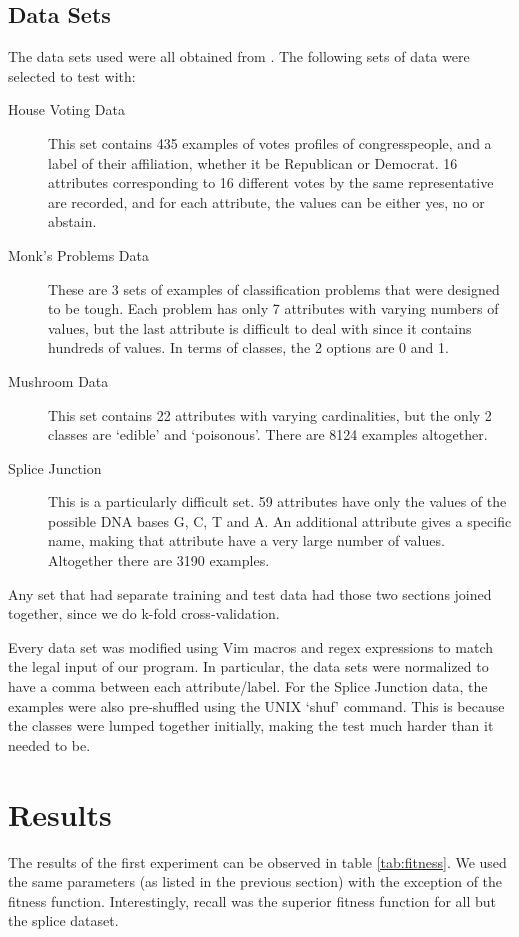 \documentclass[12pt, letterpaper]{article}
\begin{document}
\subsection*{Data Sets}
The data sets used were all obtained from \cite{ucimll}. The following sets of data were selected to test with:
\begin{description}
    \item[House Voting Data] This set contains 435 examples of votes profiles of congresspeople, and a label of their affiliation, whether it be Republican or Democrat. 16 attributes corresponding to 16 different votes by the same representative are recorded, and for each attribute, the values can be either yes, no or abstain.
    \item[Monk's Problems Data] These are 3 sets of examples of classification problems that were designed to be tough. Each problem has only 7 attributes with varying numbers of values, but the last attribute is difficult to deal with since it contains hundreds of values. In terms of classes, the 2 options are 0 and 1.
    \item[Mushroom Data] This set contains 22 attributes with varying cardinalities, but the only 2 classes are `edible' and `poisonous'. There are 8124 examples altogether.
    \item[Splice Junction] This is a particularly difficult set. 59 attributes have only the values of the possible DNA bases G, C, T and A. An additional attribute gives a specific name, making that attribute have a very large number of values. Altogether there are 3190 examples.
\end{description}

Any set that had separate training and test data had those two sections joined together, since we do k-fold cross-validation.

Every data set was modified using Vim macros and regex expressions to match the legal input of our program. In particular, the data sets were normalized to have a comma between each attribute/label. For the Splice Junction data, the examples were also pre-shuffled using the UNIX `shuf' command. This is because the classes were lumped together initially, making the test much harder than it needed to be.

\section{Results}

The results of the first experiment can be observed in table \ref{tab:fitness}. We used the same parameters (as listed in the previous section) with the exception of the fitness function. Interestingly, recall was the superior fitness function for all but the splice dataset.
\end{document}
